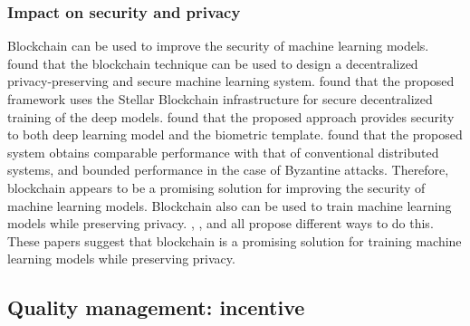 \documentclass{article}
\begin{document}
\subsubsection{Impact on security and privacy}
Blockchain can be used to improve the security of machine learning models. \cite{chen_2020} found that the blockchain technique can be used to design a decentralized privacy-preserving and secure machine learning system. \cite{fadaeddini_2019} found that the proposed framework uses the Stellar Blockchain infrastructure for secure decentralized training of the deep models. \cite{goel_2019} found that the proposed approach provides security to both deep learning model and the biometric template. \cite{wang_ai_2020} found that the proposed system obtains comparable performance with that of conventional distributed systems, and bounded performance in the case of Byzantine attacks. Therefore, blockchain appears to be a promising solution for improving the security of machine learning models.\newline
Blockchain also can be used to train machine learning models while preserving privacy. \cite{ladia_2019}, \cite{chen_2018}, and \cite{weng_2019} all propose different ways to do this. These papers suggest that blockchain is a promising solution for training machine learning models while preserving privacy.

\subsection{Quality management: incentive}
\end{document}
